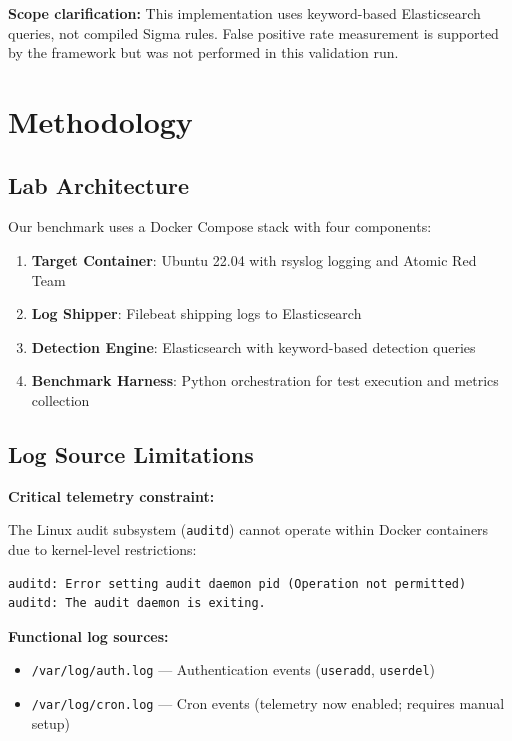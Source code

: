 \documentclass[11pt,a4paper]{article}
\begin{document}
\textbf{Scope clarification:} This implementation uses keyword-based Elasticsearch queries, not compiled Sigma rules. False positive rate measurement is supported by the framework but was not performed in this validation run.

\section{Methodology}

\subsection{Lab Architecture}

Our benchmark uses a Docker Compose stack with four components:

\begin{enumerate}
    \item \textbf{Target Container}: Ubuntu 22.04 with rsyslog logging and Atomic Red Team
    \item \textbf{Log Shipper}: Filebeat shipping logs to Elasticsearch
    \item \textbf{Detection Engine}: Elasticsearch with keyword-based detection queries
    \item \textbf{Benchmark Harness}: Python orchestration for test execution and metrics collection
\end{enumerate}

\subsection{Log Source Limitations}

\textbf{Critical telemetry constraint:}

The Linux audit subsystem (\texttt{auditd}) cannot operate within Docker containers due to kernel-level restrictions:

\begin{verbatim}
auditd: Error setting audit daemon pid (Operation not permitted)
auditd: The audit daemon is exiting.
\end{verbatim}

\textbf{Functional log sources:}
\begin{itemize}
    \item \texttt{/var/log/auth.log} --- Authentication events (\texttt{useradd}, \texttt{userdel})
    \item \texttt{/var/log/cron.log} --- Cron events (telemetry now enabled; requires manual setup)
\end{itemize}
\end{document}
